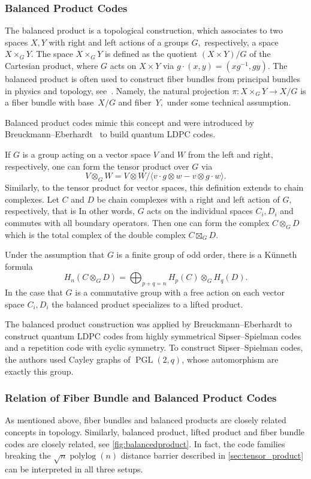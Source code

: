\documentclass[amsmath, amssymb, floatfix, reprint, twocolumn, notitlepage, 10pt]{revtex4-1}
\newcommand{\polylog}{\operatorname{polylog}}
\begin{document}
\subsubsection{Balanced Product Codes}\label{app:balancedproducts}
The balanced product is a topological construction, which associates to two spaces $X,Y$ with right and left actions of a groups $G,$ respectively, a space $X\times_G Y.$ The space $X\times_G Y$ is defined as the quotient $(X\times Y)/G$ of the Cartesian product, where $G$ acts on $X\times Y$ via $g\cdot(x,y)=(xg^{-1},gy).$ 
The balanced product is often used to construct fiber bundles from principal bundles in physics and topology, see~\cite{nakahara2003geometry}. 
Namely, the natural projection $\pi: X\times_G Y\to X/G$ is a fiber bundle with base~$X/G$ and fiber~$Y,$ under some technical assumption.

Balanced product codes mimic this concept and were introduced by Breuckmann--Eberhardt~\cite{breuckmann2020balanced} to build quantum LDPC codes.

If $G$ is a group acting on a vector space $V$ and $W$ from the left and right, respectively, one can form the tensor product over $G$ via 
$$V\otimes_G W=V\otimes W/\langle v\cdot g\otimes w - v\otimes g\cdot w \rangle.$$
Similarly, to the tensor product for vector spaces, this definition extends to chain complexes. Let $C$ and $D$ be chain complexes with a right and left action of $G,$ respectively, that is In other words, $G$ acts on the individual spaces $C_i, D_i$ and commutes with all boundary operators. Then one can form the complex $C\otimes_G D$ which is the total complex of the double complex $C\boxtimes_G D.$ 


Under the assumption that $G$ is a finite group of odd order, there is a Künneth formula
$$H_n(C\otimes_G D)=\bigoplus_{p+q=n} H_p(C)\otimes_G H_q(D).$$
In the case that $G$ is a commutative group with a free action on each vector space $C_i, D_i$ the balanced product specializes to a lifted product.

The balanced product construction was applied by Breuckmann--Eberhardt to construct quantum LDPC codes from  highly symmetrical Sipser--Spielman codes and a repetition code with cyclic symmetry. To construct Sipser--Spielman codes, the authors used Cayley graphs of $\operatorname{PGL}(2,q)$, whose automorphism are exactly this group.
\subsubsection{Relation of Fiber Bundle and Balanced Product Codes}
As mentioned above, fiber bundles and balanced products are closely related concepts in topology. Similarly, balanced product, lifted product and fiber bundle codes are closely related, see \cref{fig:balancedproduct}. In fact, the code families breaking the $\sqrt{n}\polylog(n)$ distance barrier described in \cref{sec:tensor_product} can be interpreted in all three setups.
\end{document}
